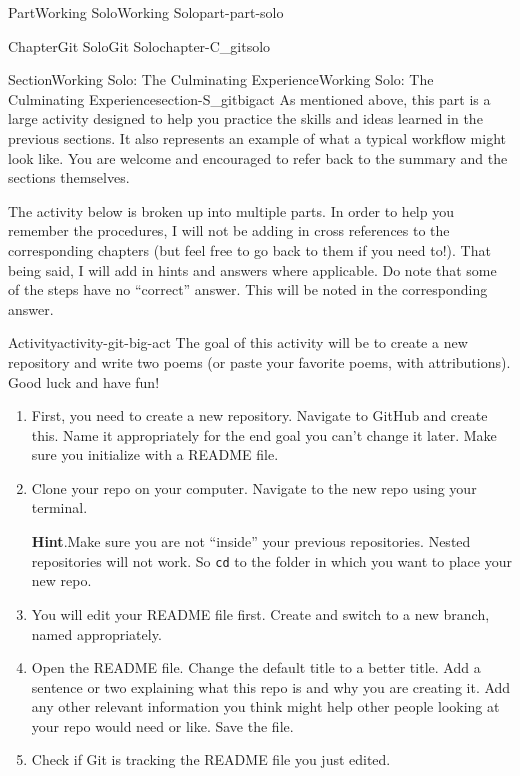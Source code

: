 \documentclass[twoside,10pt,]{book}
\newcommand{\blocktitlefont}{\relax}
\newcommand{\mono}[1]{\texttt{#1}}
\begin{document}
\begin{partptx}{Part}{Working Solo}{}{Working Solo}{}{}{part-part-solo}
\begin{chapterptx}{Chapter}{Git Solo}{}{Git Solo}{}{}{chapter-C_gitsolo}
\typeout{************************************************}
%
\begin{sectionptx}{Section}{Working Solo: The Culminating Experience}{}{Working Solo: The Culminating Experience}{}{}{section-S_gitbigact}
%
As mentioned above, this part is a large activity designed to help you practice the skills and ideas learned in the previous sections. It also represents an example of what a typical workflow might look like. You are welcome and encouraged to refer back to the summary and the sections themselves.%
\par
The activity below is broken up into multiple parts. In order to help you remember the procedures, I will not be adding in cross references to the corresponding chapters (but feel free to go back to them if you need to!). That being said, I will add in hints and answers where applicable. Do note that some of the steps have no ``correct'' answer. This will be noted in the corresponding answer.%
\begin{activity}{Activity}{}{activity-git-big-act}%
The goal of this activity will be to create a new repository and write two poems (or paste your favorite poems, with attributions). Good luck and have fun!%
\begin{enumerate}[font=\bfseries,label=(\alph*),ref=\alph*]%
\item\label{task-git-ba-newrepo}First, you need to create a new repository. Navigate to GitHub and create this. Name it appropriately for the end goal \textemdash{} you can't change it later. Make sure you initialize with a README file.%
\item\label{task-git-ba-clone}Clone your repo on your computer. Navigate to the new repo using your terminal.%
\par\smallskip%
\noindent\textbf{\blocktitlefont Hint}.\label{hint-git-ba-clone-b}{}\hypertarget{hint-git-ba-clone-b}{}\quad{}Make sure you are not ``inside'' your previous repositories. Nested repositories will not work. So \mono{cd} to the folder in which you want to place your new repo.%
\item{}You will edit your README file first. Create and switch to a new branch, named appropriately.%
\item{}Open the README file. Change the default title to a better title. Add a sentence or two explaining what this repo is and why you are creating it. Add any other relevant information you think might help other people looking at your repo would need or like. Save the file.%
\item{}Check if Git is tracking the README file you just edited.%

\end{enumerate}
\end{activity}
\end{sectionptx}
\end{chapterptx}
\end{partptx}
\end{document}

